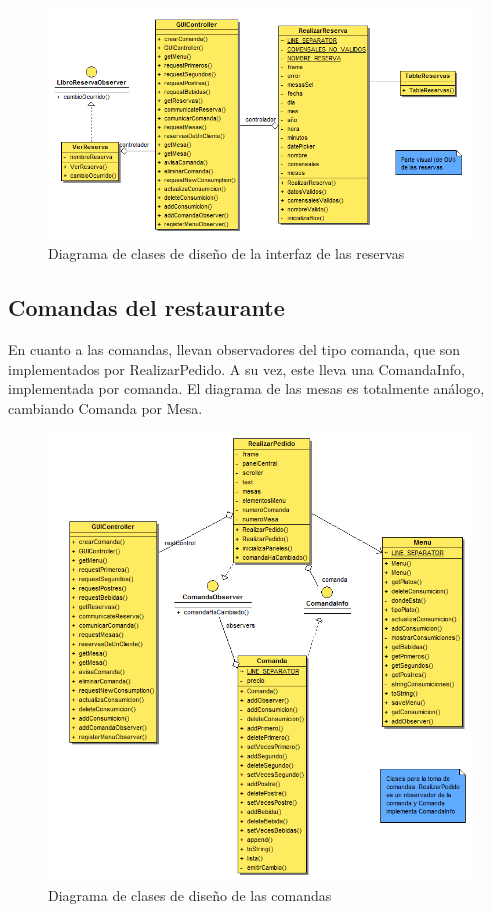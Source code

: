 \documentclass[spanish,a4paper,11pt, twoside]{report}	%
\begin{document}
		\begin{figure}[!h]
		\centering
		\includegraphics[scale=0.5]{DCDvistareservas.png}
		\caption{Diagrama de clases de diseño de la interfaz de las reservas}
		\end{figure}

		\subsection{Comandas del restaurante}
		En cuanto a las comandas, llevan observadores del tipo comanda, que son implementados por RealizarPedido. A su vez, este lleva una ComandaInfo, implementada por comanda. El diagrama de las mesas es totalmente análogo, cambiando Comanda por Mesa.
		\begin{figure}[!h]
		\centering
		\includegraphics[scale=0.5]{DCDcomandas.png}
		\caption{Diagrama de clases de diseño de las comandas}
		\end{figure}
\end{document}
